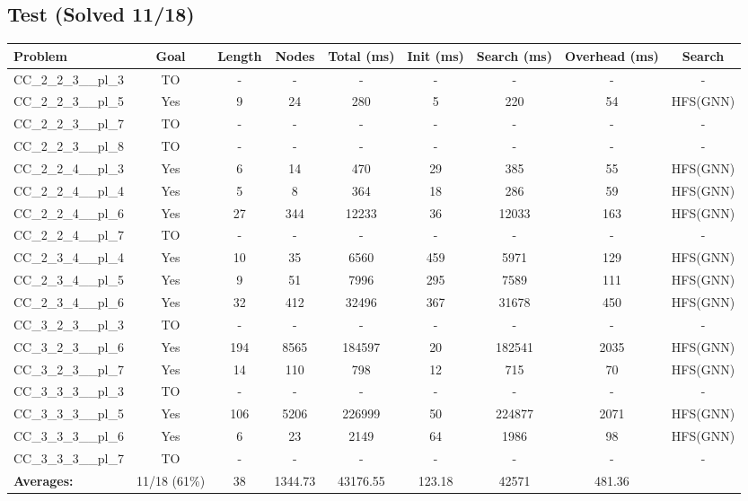 \documentclass{article}
\begin{document}
\subsection*{Test (Solved 11/18)}
\begin{tabular}{lcccccccc}
\toprule
Problem & Goal & Length & Nodes & Total (ms) & Init (ms) & Search (ms) & Overhead (ms) & Search \\
\midrule
CC\_2\_2\_3\_\_pl\_3 & TO & - & - & - & - & - & - & - \\
CC\_2\_2\_3\_\_pl\_5 & Yes & 9 & 24 & 280 & 5 & 220 & 54 & HFS(GNN) \\
CC\_2\_2\_3\_\_pl\_7 & TO & - & - & - & - & - & - & - \\
CC\_2\_2\_3\_\_pl\_8 & TO & - & - & - & - & - & - & - \\
CC\_2\_2\_4\_\_pl\_3 & Yes & 6 & 14 & 470 & 29 & 385 & 55 & HFS(GNN) \\
CC\_2\_2\_4\_\_pl\_4 & Yes & 5 & 8 & 364 & 18 & 286 & 59 & HFS(GNN) \\
CC\_2\_2\_4\_\_pl\_6 & Yes & 27 & 344 & 12233 & 36 & 12033 & 163 & HFS(GNN) \\
CC\_2\_2\_4\_\_pl\_7 & TO & - & - & - & - & - & - & - \\
CC\_2\_3\_4\_\_pl\_4 & Yes & 10 & 35 & 6560 & 459 & 5971 & 129 & HFS(GNN) \\
CC\_2\_3\_4\_\_pl\_5 & Yes & 9 & 51 & 7996 & 295 & 7589 & 111 & HFS(GNN) \\
CC\_2\_3\_4\_\_pl\_6 & Yes & 32 & 412 & 32496 & 367 & 31678 & 450 & HFS(GNN) \\
CC\_3\_2\_3\_\_pl\_3 & TO & - & - & - & - & - & - & - \\
CC\_3\_2\_3\_\_pl\_6 & Yes & 194 & 8565 & 184597 & 20 & 182541 & 2035 & HFS(GNN) \\
CC\_3\_2\_3\_\_pl\_7 & Yes & 14 & 110 & 798 & 12 & 715 & 70 & HFS(GNN) \\
CC\_3\_3\_3\_\_pl\_3 & TO & - & - & - & - & - & - & - \\
CC\_3\_3\_3\_\_pl\_5 & Yes & 106 & 5206 & 226999 & 50 & 224877 & 2071 & HFS(GNN) \\
CC\_3\_3\_3\_\_pl\_6 & Yes & 6 & 23 & 2149 & 64 & 1986 & 98 & HFS(GNN) \\
CC\_3\_3\_3\_\_pl\_7 & TO & - & - & - & - & - & - & - \\
\textbf{Averages:} & 11/18 (61\%) & 38 & 1344.73 & 43176.55 & 123.18 & 42571 & 481.36 & \\
\bottomrule
\end{tabular}
\\[0.7cm]
\end{document}
